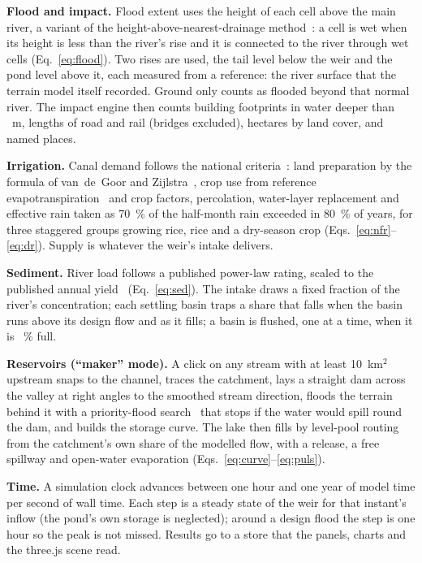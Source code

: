 \documentclass[10pt,a4paper,twocolumn]{extarticle}
\newcommand{\kmsq}{km$^2$}
\begin{document}
\textbf{Flood and impact.} Flood extent uses the height of each cell above the main river, a variant of the
height-above-nearest-drainage method~\citep{renno2008,nobre2011}: a cell is wet when its height is less than the
river's rise and it is connected to the river through wet cells (Eq.~\ref{eq:flood}). Two rises are used, the tail
level below the weir and the pond level above it, each measured from a reference: the river surface that the terrain
model itself recorded. Ground only counts as flooded beyond that normal river. The impact engine then counts
building footprints in water deeper than \MinDepth~m, lengths of road and rail (bridges excluded), hectares by land
cover, and named places.

\textbf{Irrigation.} Canal demand follows the national criteria~\citep{kp01}: land preparation by the formula of
van~de~Goor and Zijlstra~\citep{vandegoor1968}, crop use from reference evapotranspiration~\citep{allen1998} and crop
factors, percolation, water-layer replacement and effective rain taken as 70~\% of the half-month rain exceeded in
80~\% of years, for three staggered groups growing rice, rice and a dry-season crop (Eqs.~\ref{eq:nfr}--\ref{eq:dr}).
Supply is whatever the weir's intake delivers.

\textbf{Sediment.} River load follows a published power-law rating, scaled to the published annual
yield~\citep{jica2003} (Eq.~\ref{eq:sed}). The intake draws a fixed fraction of the river's concentration; each settling basin traps a
share that falls when the basin runs above its design flow and as it fills; a basin is flushed, one at a time, when
it is \SedFlushAtPct~\% full.

\textbf{Reservoirs (``maker'' mode).} A click on any stream with at least 10~\kmsq{} upstream snaps to the channel,
traces the catchment, lays a straight dam across the valley at right angles to the smoothed stream direction, floods
the terrain behind it with a priority-flood search~\citep{barnes2014} that stops if the water would spill round the
dam, and builds the storage curve. The lake then fills by level-pool routing~\citep{chow1988} from the catchment's
own share of the modelled flow, with a release, a free spillway and open-water evaporation
(Eqs.~\ref{eq:curve}--\ref{eq:puls}).

\textbf{Time.} A simulation clock advances between one hour and one year of model time per second of wall time.
Each step is a steady state of the weir for that instant's inflow (the pond's own storage is neglected); around a
design flood the step is one hour so the peak is not missed. Results go to a store that the panels, charts and the
three.js scene read.
\end{document}
